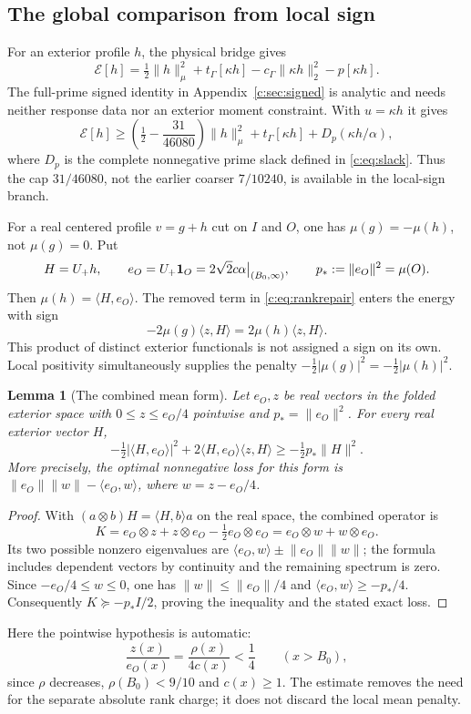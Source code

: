 \documentclass[11pt,a4paper]{article}
\numberwithin{equation}{section}
\newtheorem{lemma}[theorem]{Lemma}
\theoremstyle{definition}\newtheorem{definition}[theorem]{Definition}
\theoremstyle{remark}\newtheorem{remark}[theorem]{Remark}
\newcommand{\E}{\mathcal E}\newcommand{\D}{\mathcal D}
\newcommand{\tg}{t_\Gamma}\newcommand{\cg}{c_\Gamma}
\newcommand{\ip}[2]{\langle#1,#2\rangle}\newcommand{\norm}[1]{\lVert#1\rVert}\newcommand{\abs}[1]{\lvert#1\rvert}
\begin{document}
\subsection{The global comparison from local sign}\label{c:sec:firstproof}
For an exterior profile $h$, the physical bridge gives
\[
 \E[h]=\tfrac12\norm h_\mu^2+\tg[\kappa h]
 -\cg\norm{\kappa h}_2^2-p[\kappa h].
\]
The full-prime signed identity in Appendix~\ref{c:sec:signed} is analytic and needs neither response data nor an exterior moment constraint. With $u=\kappa h$ it gives
\begin{equation}\label{c:eq:exteriorenergy}
 \E[h]\ge\left(\tfrac12-\frac{31}{46080}\right)\norm h_\mu^2
 +\tg[\kappa h]+D_p(\kappa h/\alpha),
\end{equation}
where $D_p$ is the complete nonnegative prime slack defined in \eqref{c:eq:slack}.
Thus the cap $31/46080$, not the earlier coarser $7/10240$, is available in the local-sign branch.

For a real centered profile $v=g+h$ cut on $I$ and $O$, one has
$\mu(g)=-\mu(h)$, not $\mu(g)=0$. Put
\[
 H=U_+ h,\qquad e_O=U_+ \one_O=2\sqrt2c\alpha\big|_{({B_0},\infty)},\qquad
 p_*:=\norm{e_O}^2=\mu(O).
\]
Then $\mu(h)=\ip H{e_O}$.
The removed term in \eqref{c:eq:rankrepair} enters the energy with sign
\[
 -2\mu(g)\ip zH=2\mu(h)\ip zH.
\]
This product of distinct exterior functionals is not assigned a sign on its own. Local positivity simultaneously supplies the penalty
$-\tfrac12|\mu(g)|^2=-\tfrac12|\mu(h)|^2$.

\begin{lemma}[The combined mean form]\label{c:lem:coupledmean}
Let $e_O,z$ be real vectors in the folded exterior space with
$0\le z\le e_O/4$ pointwise and $p_*=\norm{e_O}^2$.
For every real exterior vector $H$,
\begin{equation}\label{c:eq:combinedmean}
 -\tfrac12|\ip H{e_O}|^2+2\ip H{e_O}\ip zH
 \ge-\tfrac12p_*\norm H^2.
\end{equation}
More precisely, the optimal nonnegative loss for this form is
$\norm{e_O}\norm w-\ip{e_O}w$, where $w=z-e_O/4$.
\end{lemma}
\begin{proof}
With $(a\otimes b)H=\ip Hb a$ on the real space, the combined operator is
\[
 K=e_O\otimes z+z\otimes e_O-\tfrac12e_O\otimes e_O
   =e_O\otimes w+w\otimes e_O.
\]
Its two possible nonzero eigenvalues are
$\ip{e_O}w\pm\norm{e_O}\norm w$; the formula includes dependent vectors by continuity and the remaining spectrum is zero.
Since $-e_O/4\le w\le0$, one has
$\norm w\le\norm{e_O}/4$ and $\ip{e_O}w\ge-p_*/4$.
Consequently $K\succeq-p_*I/2$, proving the inequality and the stated exact loss.
\end{proof}
Here the pointwise hypothesis is automatic:
\[
 \frac{z(x)}{e_O(x)}=\frac{\rho(x)}{4c(x)}<\frac14\qquad(x>{B_0}),
\]
since $\rho$ decreases, $\rho({B_0})<9/10$ and $c(x)\ge1$.
The estimate removes the need for the separate absolute rank charge; it does not discard the local mean penalty.
\end{document}
